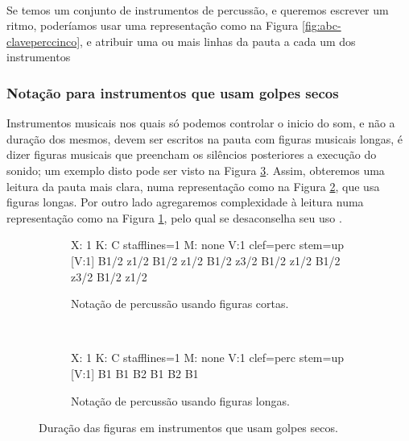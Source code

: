 \begin{example} ~

\begin{minipage}{0.845\textwidth}
Se temos um conjunto de instrumentos de percussão, 
e queremos escrever um ritmo, poderíamos usar uma representação como na Figura \ref{fig:abc-claveperccinco},
e atribuir uma ou mais linhas da pauta a cada um dos instrumentos
\end{minipage}
\end{example} 



\subsubsection{Notação para instrumentos que usam golpes secos}
Instrumentos musicais nos quais só podemos controlar o inicio do som, e não a duração dos mesmos, 
devem ser escritos na pauta com figuras musicais longas, 
é dizer figuras musicais que preencham os silêncios posteriores a execução do sonido;
um exemplo disto pode ser visto na Figura \ref{fig:clavepercusiondryall}.
Assim, obteremos uma leitura da pauta mais clara, 
numa representação como na Figura \ref{fig:abc-clavepercusiondry2}, que usa figuras longas.
Por outro lado agregaremos complexidade à leitura numa representação como na Figura \ref{fig:abc-clavepercusiondry1},
pelo qual se desaconselha seu uso \cite[pp. 289]{gould676behind}.
\begin{figure}[h]
    \centering 
\begin{subfigure}[c]{0.75\textwidth}
\begin{abc}[name=abc-clavepercusiondry1]
%
X: 1 %
K: C stafflines=1 %
M: none %
V:1 clef=perc stem=up %
%
[V:1] B1/2 z1/2 B1/2 z1/2 B1/2 z3/2 B1/2 z1/2 B1/2 z3/2 B1/2 z1/2 
\end{abc}
\caption{Notação de percussão usando figuras cortas.}
\label{fig:abc-clavepercusiondry1}
\end{subfigure}
~%
\begin{subfigure}[c]{0.70\textwidth}
\begin{abc}[name=abc-clavepercusiondry2]
%
X: 1 %
K: C stafflines=1 %
M: none %
V:1 clef=perc stem=up %
%
[V:1] B1 B1 B2 B1 B2 B1 
\end{abc}
\caption{Notação de percussão usando figuras longas.}
\label{fig:abc-clavepercusiondry2}
\end{subfigure}
    \caption{Duração das figuras em instrumentos que usam golpes secos.}\label{fig:clavepercusiondryall}
\end{figure}

